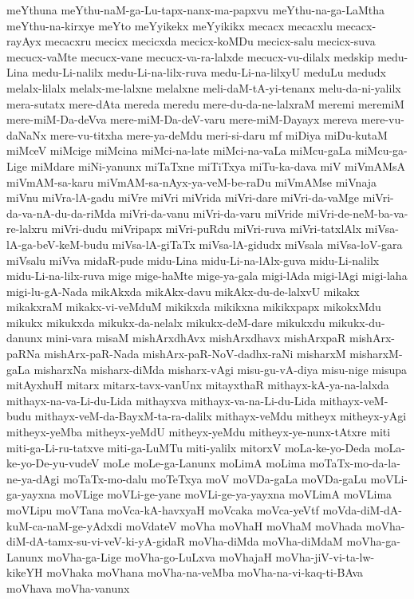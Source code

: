 {meYthuna
meYthu-naM-ga-Lu-tapx-nanx-ma-papxvu
meYthu-na-ga-LaMtha
meYthu-na-kirxye
meYto
meYyikekx
meYyikikx
mecacx
mecacxlu
mecacx-rayAyx
mecacxru
mecicx
mecicxda
mecicx-koMDu
mecicx-salu
mecicx-suva
mecucx-vaMte
mecucx-vane
mecucx-va-ra-lalxde
mecucx-vu-dilalx
medskip
medu-Lina
medu-Li-nalilx
medu-Li-na-lilx-ruva
medu-Li-na-lilxyU
meduLu
medudx
melalx-lilalx
melalx-me-lalxne
melalxne
meli-daM-tA-yi-tenanx
melu-da-ni-yalilx
mera-sutatx
mere-dAta
mereda
meredu
mere-du-da-ne-lalxraM
meremi
meremiM
mere-miM-Da-deVva
mere-miM-Da-deV-varu
mere-miM-Dayayx
mereva
mere-vu-daNaNx
mere-vu-titxha
mere-ya-deMdu
meri-si-daru
mf
miDiya
miDu-kutaM
miMceV
miMcige
miMcina
miMci-na-late
miMci-na-vaLa
miMcu-gaLa
miMcu-ga-Lige
miMdare
miNi-yanunx
miTaTxne
miTiTxya
miTu-ka-dava
miV
miVmAMsA
miVmAM-sa-karu
miVmAM-sa-nAyx-ya-veM-be-raDu
miVmAMse
miVnaja
miVnu
miVra-lA-gadu
miVre
miVri
miVrida
miVri-dare
miVri-da-vaMge
miVri-da-va-nA-du-da-riMda
miVri-da-vanu
miVri-da-varu
miVride
miVri-de-neM-ba-va-re-lalxru
miVri-dudu
miVripapx
miVri-puRdu
miVri-ruva
miVri-tatxlAlx
miVsa-lA-ga-beV-keM-budu
miVsa-lA-giTaTx
miVsa-lA-gidudx
miVsala
miVsa-loV-gara
miVsalu
miVva
midaR-pude
midu-Lina
midu-Li-na-lAlx-guva
midu-Li-nalilx
midu-Li-na-lilx-ruva
mige
mige-haMte
mige-ya-gala
migi-lAda
migi-lAgi
migi-laha
migi-lu-gA-Nada
mikAkxda
mikAkx-davu
mikAkx-du-de-lalxvU
mikakx
mikakxraM
mikakx-vi-veMduM
mikikxda
mikikxna
mikikxpapx
mikokxMdu
mikukx
mikukxda
mikukx-da-nelalx
mikukx-deM-dare
mikukxdu
mikukx-du-danunx
mini-vara
misaM
mishArxdhAvx
mishArxdhavx
mishArxpaR
mishArx-paRNa
mishArx-paR-Nada
mishArx-paR-NoV-dadhx-raNi
misharxM
misharxM-gaLa
misharxNa
misharx-diMda
misharx-vAgi
misu-gu-vA-diya
misu-nige
misupa
mitAyxhuH
mitarx
mitarx-tavx-vanUnx
mitayxthaR
mithayx-kA-ya-na-lalxda
mithayx-na-va-Li-du-Lida
mithayxva
mithayx-va-na-Li-du-Lida
mithayx-veM-budu
mithayx-veM-da-BayxM-ta-ra-dalilx
mithayx-veMdu
mitheyx
mitheyx-yAgi
mitheyx-yeMba
mitheyx-yeMdU
mitheyx-yeMdu
mitheyx-ye-nunx-tAtxre
miti
miti-ga-Li-ru-tatxve
miti-ga-LuMTu
miti-yalilx
mitorxV
moLa-ke-yo-Deda
moLa-ke-yo-De-yu-vudeV
moLe
moLe-ga-Lanunx
moLimA
moLima
moTaTx-mo-da-la-ne-ya-dAgi
moTaTx-mo-dalu
moTeTxya
moV
moVDa-gaLa
moVDa-gaLu
moVLi-ga-yayxna
moVLige
moVLi-ge-yane
moVLi-ge-ya-yayxna
moVLimA
moVLima
moVLipu
moVTana
moVca-kA-havxyaH
moVcaka
moVca-yeVtf
moVda-diM-dA-kuM-ca-naM-ge-yAdxdi
moVdateV
moVha
moVhaH
moVhaM
moVhada
moVha-diM-dA-tamx-su-vi-veV-ki-yA-gidaR
moVha-diMda
moVha-diMdaM
moVha-ga-Lanunx
moVha-ga-Lige
moVha-go-LuLxva
moVhajaH
moVha-jiV-vi-ta-lw-kikeYH
moVhaka
moVhana
moVha-na-veMba
moVha-na-vi-kaq-ti-BAva
moVhava
moVha-vanunx
}
